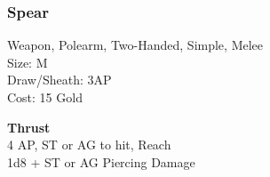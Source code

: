 \subsubsection{Spear}\label{weapon:spear}
Weapon, Polearm, Two-Handed, Simple, Melee\\
Size: M\\
Draw/Sheath: 3AP\\
Cost: 15 Gold

\textbf{Thrust}\\
4 AP, ST or AG to hit,  Reach\\
1d8 + \texttimes ST or AG Piercing Damage


